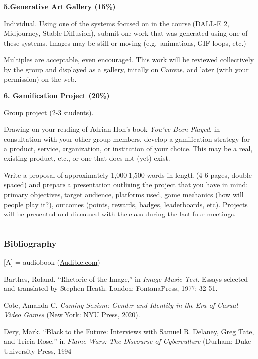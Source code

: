 \documentclass[
  letterpaper,
  DIV=11,
  numbers=noendperiod]{scrartcl}
\begin{document}
\textbf{5.Generative Art Gallery (15\%)}

Individual. Using one of the systems focused on in the course (DALL-E 2,
Midjourney, Stable Diffusion), submit one work that was generated using
one of these systems. Images may be still or moving (e.g.~animations,
GIF loops, etc.)

Multiples are acceptable, even encouraged. This work will be reviewed
collectively by the group and displayed as a gallery, initally on
Canvas, and later (with your permission) on the web.

\textbf{6. Gamification Project (20\%)}

Group project (2-3 students).

Drawing on your reading of Adrian Hon's book \emph{You've Been Played},
in consultation with your other group members, develop a gamification
strategy for a product, service, organization, or institution of your
choice. This may be a real, existing product, etc., or one that does not
(yet) exist.

Write a proposal of approximately 1,000-1,500 words in length (4-6
pages, double-spaced) and prepare a presentation outlining the project
that you have in mind: primary objectives, target audience, platforms
used, game mechanics (how will people play it?), outcomes (points,
rewards, badges, leaderboards, etc). Projects will be presented and
discussed with the class during the last four meetings.

\begin{center}\rule{0.5\linewidth}{0.5pt}\end{center}

\hypertarget{bibliography}{%
\subsubsection{Bibliography}\label{bibliography}}

{[}A{]} = audiobook (\href{http://audible.com/}{Audible.com})

Barthes, Roland. ``Rhetoric of the Image,'' in \emph{Image Music Text}.
Essays selected and translated by Stephen Heath. London: FontanaPress,
1977: 32-51.

Cote, Amanda C. \emph{Gaming Sexism: Gender and Identity in the Era of
Casual Video Games} (New York: NYU Press, 2020).

Dery, Mark. ``Black to the Future: Interviews with Samuel R. Delaney,
Greg Tate, and Tricia Rose,'' in \emph{Flame Wars: The Discourse of
Cyberculture} (Durham: Duke University Press, 1994
\end{document}
